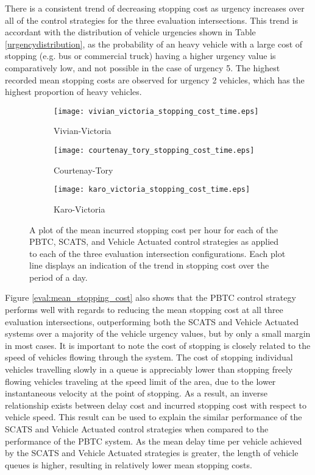 There is a consistent trend of decreasing stopping cost as urgency increases over all of the control strategies for the three evaluation intersections. This trend is accordant with the distribution of vehicle urgencies shown in Table \ref{urgencydistribution}, as the probability of an heavy vehicle with a large cost of stopping (e.g. bus or commercial truck) having a higher urgency value is comparatively low, and not possible in the case of urgency 5. The highest recorded mean stopping costs are observed for urgency 2 vehicles, which has the highest proportion of heavy vehicles. 

\begin{figure}
\centering
\begin{subfigure}{.5\textwidth}
  \centering
  \texttt{[image: vivian\_victoria\_stopping\_cost\_time.eps]}
  \caption{Vivian-Victoria}
  \label{stopping_cost_time:sub1}
\end{subfigure}%
\begin{subfigure}{.5\textwidth}
  \centering
  \texttt{[image: courtenay\_tory\_stopping\_cost\_time.eps]}
  \caption{Courtenay-Tory}
  \label{stopping_cost_time:sub2}
\end{subfigure}

\vspace{1cm}

\begin{subfigure}{.5\textwidth}
  \centering
  \texttt{[image: karo\_victoria\_stopping\_cost\_time.eps]}
  \caption{Karo-Victoria}
  \label{stopping_cost_time:sub3}
\end{subfigure}%
\caption[Results of measuring the mean stopping cost per hour incurred for each evaluation control strategy and intersection.]{ A plot of the mean incurred stopping cost per hour for each of the PBTC, SCATS, and Vehicle Actuated control strategies as applied to each of the three evaluation intersection configurations. Each plot line displays an indication of the trend in stopping cost over the period of a day.  }
\label{eval:stopping_cost_time}
\end{figure}

Figure \ref{eval:mean_stopping_cost} also shows that the PBTC control strategy performs well with regards to reducing the mean stopping cost at all three evaluation intersections, outperforming both the SCATS and Vehicle Actuated systems over a majority of the vehicle urgency values, but by only a small margin in most cases. It is important to note the cost of stopping is closely related to the speed of vehicles flowing through the system. The cost of stopping individual vehicles travelling slowly in a queue is appreciably lower than stopping freely flowing vehicles traveling at the speed limit of the area, due to the lower instantaneous velocity at the point of stopping. As a result, an inverse relationship exists between delay cost and incurred stopping cost with respect to vehicle speed. This result can be used to explain the similar performance of the SCATS and Vehicle Actuated control strategies when compared to the performance of the PBTC system. As the mean delay time per vehicle achieved by the SCATS and Vehicle Actuated strategies is greater, the length of vehicle queues is higher, resulting in relatively lower mean stopping costs.

